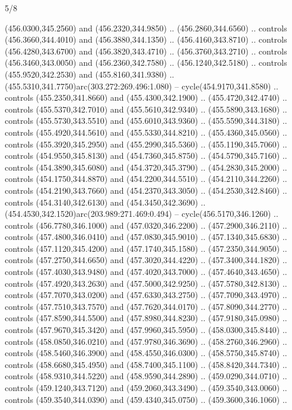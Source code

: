 \begin{flagdescription}{5/8}
\begin{scope}[xshift=0.5\flaglength,yshift=0.5\flagwidth,scale=\flagwidth/475.63]
\begin{scope}[y=0.8pt, x=0.8pt, yscale=-1, xscale=1,shift={(-450,-300)}]
\begin{scope}[cm={{1.0,0.0,0.0,1.0,(-0.0002,0.12556)}},cm={{1.0,0.0,0.0,1.0,(0.00179,0.0)}}]
\begin{scope}[cm={{1.01375,0.0,0.0,1.01375,(-5.36379,-4.94943)}}]
  (456.0300,345.2560) and (456.2320,344.9850) .. (456.2860,344.6560) .. controls
  (456.3660,344.4010) and (456.3880,344.1350) .. (456.4160,343.8710) .. controls
  (456.4280,343.6700) and (456.3820,343.4710) .. (456.3760,343.2710) .. controls
  (456.3460,343.0050) and (456.2360,342.7580) .. (456.1240,342.5180) .. controls
  (455.9520,342.2530) and (455.8160,341.9380) ..
  (455.5310,341.7750)arc(303.272:269.496:1.080) -- cycle(454.9170,341.8580) ..
  controls (455.2350,341.8660) and (455.4300,342.1900) .. (455.4720,342.4740) ..
  controls (455.5370,342.7010) and (455.5610,342.9340) .. (455.5890,343.1680) ..
  controls (455.5730,343.5510) and (455.6010,343.9360) .. (455.5590,344.3180) ..
  controls (455.4920,344.5610) and (455.5330,344.8210) .. (455.4360,345.0560) ..
  controls (455.3920,345.2950) and (455.2990,345.5360) .. (455.1190,345.7060) ..
  controls (454.9550,345.8130) and (454.7360,345.8750) .. (454.5790,345.7160) ..
  controls (454.3890,345.6080) and (454.3720,345.3790) .. (454.2830,345.2000) ..
  controls (454.1750,344.8870) and (454.2200,344.5510) .. (454.2110,344.2260) ..
  controls (454.2190,343.7660) and (454.2370,343.3050) .. (454.2530,342.8460) ..
  controls (454.3140,342.6130) and (454.3450,342.3690) ..
  (454.4530,342.1520)arc(203.989:271.469:0.494) -- cycle(456.5170,346.1260) ..
  controls (456.7780,346.1000) and (457.0320,346.2200) .. (457.2900,346.2110) ..
  controls (457.4800,346.0410) and (457.0830,345.9010) .. (457.1340,345.6830) ..
  controls (457.1120,345.4200) and (457.1740,345.1580) .. (457.2350,344.9050) ..
  controls (457.2750,344.6650) and (457.3020,344.4220) .. (457.3400,344.1820) ..
  controls (457.4030,343.9480) and (457.4020,343.7000) .. (457.4640,343.4650) ..
  controls (457.4920,343.2630) and (457.5000,342.9250) .. (457.5780,342.8130) ..
  controls (457.7070,343.0200) and (457.6330,343.2750) .. (457.7090,343.4970) ..
  controls (457.7510,343.7570) and (457.7620,344.0170) .. (457.8090,344.2770) ..
  controls (457.8590,344.5500) and (457.8980,344.8230) .. (457.9180,345.0980) ..
  controls (457.9670,345.3420) and (457.9960,345.5950) .. (458.0300,345.8440) ..
  controls (458.0850,346.0210) and (457.9780,346.3690) .. (458.2760,346.2960) ..
  controls (458.5460,346.3900) and (458.4550,346.0300) .. (458.5750,345.8740) ..
  controls (458.6680,345.4950) and (458.7400,345.1100) .. (458.8420,344.7340) ..
  controls (458.9310,344.5220) and (458.9590,344.2890) .. (459.0290,344.0710) ..
  controls (459.1240,343.7120) and (459.2060,343.3490) .. (459.3540,343.0060) ..
  controls (459.3540,344.0390) and (459.4340,345.0750) .. (459.3600,346.1060) ..

\end{scope}
\end{scope}
\end{scope}
\end{scope}
\end{flagdescription}
